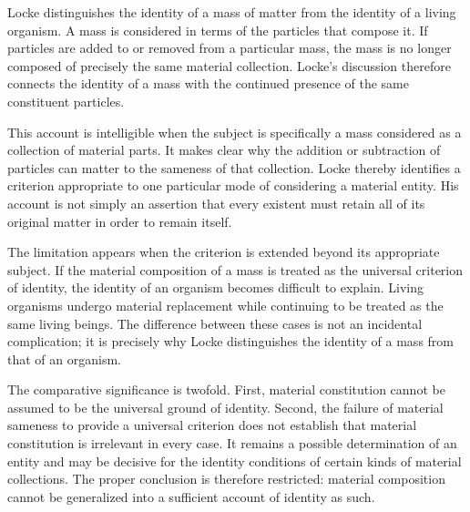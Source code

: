 \label{para:VS.B01.P01.C08.S08.SS04.P001}

Locke distinguishes the identity of a mass of matter
from the identity of a living organism. A mass is
considered in terms of the particles that compose it.
If particles are added to or removed from a particular
mass, the mass is no longer composed of precisely the
same material collection. Locke's discussion therefore
connects the identity of a mass with the continued
presence of the same constituent particles.
\cite[II.xxvii.3--4]{LockeEssay}

\label{para:VS.B01.P01.C08.S08.SS04.P002}

This account is intelligible when the subject is
specifically a mass considered as a collection of
material parts. It makes clear why the addition or
subtraction of particles can matter to the sameness
of that collection. Locke thereby identifies a
criterion appropriate to one particular mode of
considering a material entity. His account is not
simply an assertion that every existent must retain
all of its original matter in order to remain itself.

\label{para:VS.B01.P01.C08.S08.SS04.P003}

The limitation appears when the criterion is extended
beyond its appropriate subject. If the material
composition of a mass is treated as the universal
criterion of identity, the identity of an organism
becomes difficult to explain. Living organisms undergo
material replacement while continuing to be treated
as the same living beings. The difference between
these cases is not an incidental complication; it
is precisely why Locke distinguishes the identity
of a mass from that of an organism.

\label{para:VS.B01.P01.C08.S08.SS04.P004}

The comparative significance is twofold. First,
material constitution cannot be assumed to be the
universal ground of identity. Second, the failure
of material sameness to provide a universal criterion
does not establish that material constitution is
irrelevant in every case. It remains a possible
determination of an entity and may be decisive for
the identity conditions of certain kinds of material
collections. The proper conclusion is therefore
restricted: material composition cannot be generalized
into a sufficient account of identity as such.

